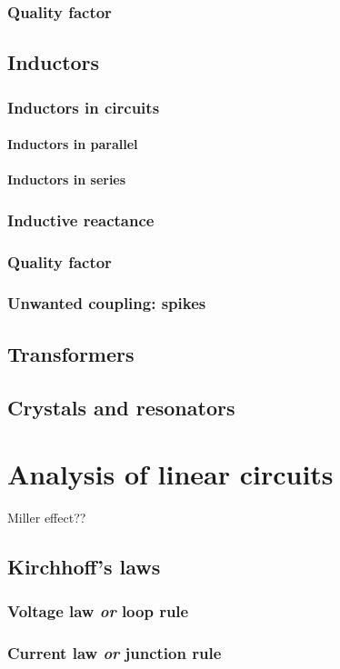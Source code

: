 \documentclass{report}
\begin{document}
\subsection{Quality factor}
\section{Inductors}
\subsection{Inductors in circuits}
\subsubsection{Inductors in parallel}
\subsubsection{Inductors in series}
\subsection{Inductive reactance}
\subsection{Quality factor}
\subsection{Unwanted coupling: spikes}
\section{Transformers}
\section{Crystals and resonators}

\chapter{Analysis of linear circuits}
Miller effect??
\section{Kirchhoff's laws}
\subsection{Voltage law \textit{or} loop rule}
\subsection{Current law \textit{or} junction rule}
\end{document}
